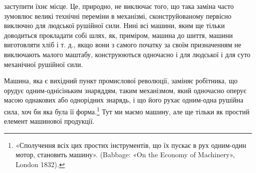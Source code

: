 \parcont{}  %
заступити їхнє місце. Це, природно, не виключає того, що така
заміна часто зумовлює великі технічні переміни в механізмі,
сконструйованому первісно виключно для людської рушійної
сили. Нині всі машини, яким ще тільки доводиться прокладати
собі шлях, як, приміром, машина до шиття, машини виготовляти
хліб і т. д., якщо вони з самого початку за своїм призначенням не
виключають малого маштабу, конструюються одночасно і для людської
і для суто механічної рушійної сили.

Машина, яка є вихідний пункт промислової революції, заміняє
робітника, що орудує одним-однісіньким знаряддям, таким механізмом,
який одночасно оперує масою однакових або однорідних
знарядь, і що його рухає одним-одна рушійна сила, хоч би яка
була її форма.\footnote{
«Сполучення всіх цих простих інструментів, що їх пускає в рух
одним-один мотор, становить машину». (Babbage: «On the Economy
of Machinery», London 1832).
} Тут ми маємо машину, але ще тільки як простий
елемент машинової продукції.

